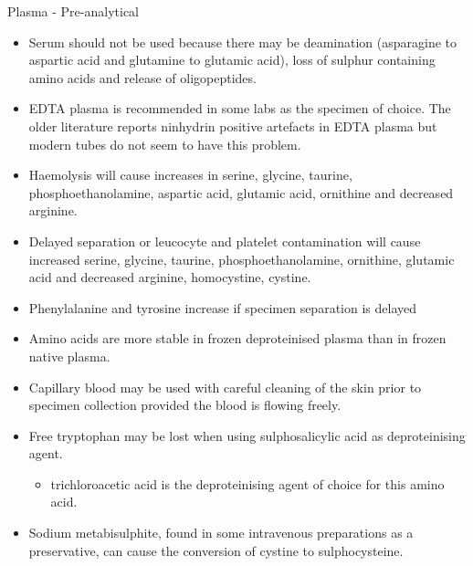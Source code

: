 \documentclass[presentation, smaller]{beamer}
\begin{document}
\begin{frame}[label={sec:orgheadline6}]{Plasma - Pre-analytical}
\begin{itemize}
\item Serum should not be used because there may be deamination (asparagine to
aspartic acid and glutamine to glutamic acid), loss of sulphur
containing amino acids and release of oligopeptides.
\item EDTA plasma is recommended in some labs as the specimen of
choice. The older literature reports ninhydrin positive artefacts in
EDTA plasma but modern tubes do not seem to have this problem.
\item Haemolysis will cause increases in serine, glycine, taurine,
phosphoethanolamine, aspartic acid, glutamic acid, ornithine and
decreased arginine.
\item Delayed separation or leucocyte and platelet contamination will
cause increased serine, glycine, taurine, phosphoethanolamine,
ornithine, glutamic acid and decreased arginine, homocystine,
cystine.
\item Phenylalanine and tyrosine increase if specimen separation is
delayed
\item Amino acids are more stable in frozen deproteinised plasma than
in frozen native plasma.
\item Capillary blood may be used with careful cleaning of the skin prior
to specimen collection provided the blood is flowing freely.
\item Free tryptophan may be lost when using sulphosalicylic acid as
deproteinising agent.
\begin{itemize}
\item trichloroacetic acid is the deproteinising agent of choice for
this amino acid.
\end{itemize}
\item Sodium metabisulphite, found in some intravenous preparations as a
preservative, can cause the conversion of cystine to sulphocysteine.
\end{itemize}
\end{frame}
\end{document}
